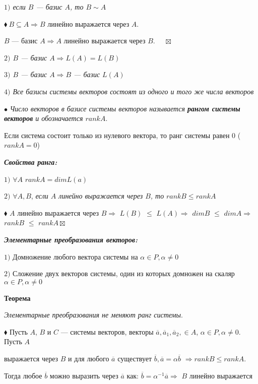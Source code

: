 \documentclass[a4paper, 12pt]{report}
\begin{document}
	\textit{$1)$ если $B$ --- базис $A$, то $B \sim A$}
	
	$\blacklozenge\ B \subseteq A \Rightarrow B$ линейно выражается через $A$.
	
	\quad$B$ --- базис $A \Rightarrow A$ линейно выражается через $B$. $\quad\boxtimes$
	
	\textit{$2)$ $B$ --- базис $A \Rightarrow L(A) = L(B)$}
	
	\textit{$3)$ $B$ --- базис $A \Rightarrow B$ --- базис $L(A)$}
	
	\textit{$4)$ Все базисы системы векторов состоят из одного и того же числа векторов}
	\par\bigskip
	
	$\bullet$ \textit{Число векторов в базисе системы векторов называется \textbf{рангом системы векторов} и обозначается $rankA$}.
	
	Если система состоит только из нулевого вектора, то ранг системы равен 0 ($rankA = 0$)
	\par\bigskip
	\textit{\textbf{Свойства ранга:}}
	
	$1)$ $\forall A$ $rankA = dimL(a)$
	
	$2)$ $\forall A, B$, \textit{если $A$ линейно выражается через $B$, то}
	$rankB \leqslant rankA$
	
	$\blacklozenge$ $A$ линейно выражается через $B \Rightarrow$ $L(B)$ $\leqslant$  $L(A) \Rightarrow$ $dimB$ $\leqslant$  $dimA \Rightarrow$ $rankB$ $\leqslant$  $rankA \boxtimes$
	\par\bigskip
	\textit{\textbf{ Элементарные преобразования векторов:}}
	
	$1)$ Домножение любого вектора системы на $\alpha \in P, \alpha \ne 0$
	
	$2)$ Сложение двух векторов системы, один из которых домножен на скаляр $\alpha \in P, \alpha \ne 0$
	\par\bigskip
	\textbf{Теорема}
	
	\textit{Элементарные преобразования не меняют ранг системы}.
	\par\bigskip
	$\blacklozenge$ Пусть $A$, $B$ и $C$ --- системы векторов, векторы $\overline{a}, \overline{a}_{1}, \overline{a}_{2}, \in A$, $\alpha \in P, \alpha \ne 0$. Пусть $A$ 
	
	 выражается через $B$ и для любого $\overline{a}$ существует $\overline{b}, \overline{a} = \alpha \overline{b}$ $\Rightarrow rankB \leqslant rankA$.
	
	\quad Тогда любое $\overline{b}$ можно выразить через $\overline{a}$ как: $\overline{b} = {\alpha}^{-1}\overline{a} \Rightarrow$ $B$ линейно выражается 
	
\end{document}
